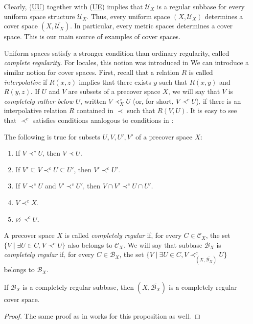 \documentclass[reqno]{amsart}
\newcommand{\axref}[1]{(\hyperref[ax:#1]{#1})}
\theoremstyle{definition}
\theoremstyle{remark}
\numberwithin{figure}{section}
\newcommand{\rb}{\prec}
\begin{document}
Clearly, \axref{UU} together with \axref{UE} implies that $\mathcal{U}_X$ is a regular subbase for every uniform space structure $\mathcal{U}_X$.
Thus, every uniform space $(X,\mathcal{U}_X)$ determines a cover space $(X,\overline{\mathcal{U}_X})$.
In particular, every metric spaces determines a cover space.
This is our main source of examples of cover spaces.

Uniform spaces satisfy a stronger condition than ordinary regularity, called \emph{complete regularity}.
For locales, this notion was introduced in %
We can introduce a similar notion for cover spaces.
First, recall that a relation $R$ is called \emph{interpolative} if $R(x,z)$ implies that there exists $y$ such that $R(x,y)$ and $R(y,z)$.
If $U$ and $V$ are subsets of a precover space $X$, we will say that $V$ is \emph{completely rather below} $U$, written $V \rb^c_X U$ (or, for short, $V \rb^c U$), if there is an interpolative relation $R$ contained in $\rb$ such that $R(V,U)$.
It is easy to see that $\rb^c$ satisfies conditions analogous to conditions in :

\begin{prop}
The following is true for subsets $U,V,U',V'$ of a precover space $X$:
\begin{enumerate}
\item If $V \rb^c U$, then $V \rb U$.
\item If $V' \subseteq V \rb^c U \subseteq U'$, then $V' \rb^c U'$.
\item If $V \rb^c U$ and $V' \rb^c U'$, then $V \cap V' \rb^c U \cap U'$.
\item $V \rb^c X$.
\item $\varnothing \rb^c U$.
\end{enumerate}
\end{prop}

A precover space $X$ is called \emph{completely regular} if, for every $C \in \mathcal{C}_X$, the set $\{ V \mid \exists U \in C, V \rb^c U \}$ also belongs to $\mathcal{C}_X$.
We will say that subbase $\mathcal{B}_X$ is \emph{completely regular} if, for every $C \in \mathcal{B}_X$, the set $\{ V \mid \exists U \in C, V \rb^c_{(X,\overline{\mathcal{B}_X})} U \}$ belongs to $\overline{\mathcal{B}_X}$.

\begin{prop}
If $\mathcal{B}_X$ is a completely regular subbase, then $(X,\overline{\mathcal{B}_X})$ is a completely regular cover space.
\end{prop}
\begin{proof}
The same proof as in  works for this proposition as well.
\end{proof}
\end{document}
